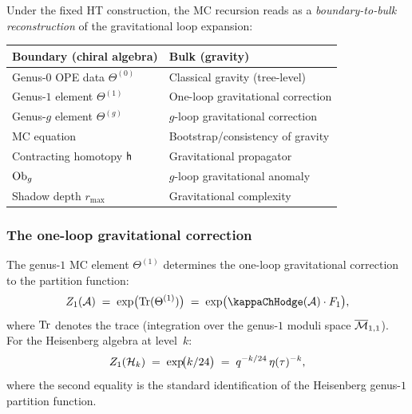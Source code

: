 \begin{principle}
Under the fixed HT construction, the MC recursion reads as a
\emph{boundary-to-bulk reconstruction} of the gravitational loop
expansion:
\begin{center}
\begin{tabular}{ll}
\textbf{Boundary (chiral algebra)} &
\textbf{Bulk (gravity)} \\
\hline
Genus-$0$ OPE data $\Theta^{(0)}$ &
Classical gravity (tree-level) \\
Genus-$1$ element $\Theta^{(1)}$ &
One-loop gravitational correction \\
Genus-$g$ element $\Theta^{(g)}$ &
$g$-loop gravitational correction \\
MC equation &
Bootstrap/consistency of gravity \\
Contracting homotopy $\mathsf{h}$ &
Gravitational propagator \\
$\mathrm{Ob}_g$ &
$g$-loop gravitational anomaly \\
Shadow depth $r_{\max}$ &
Gravitational complexity
\end{tabular}
\end{center}
\end{principle}

\subsubsection{The one-loop gravitational correction}

\begin{theorem}
The genus-$1$ MC element $\Theta^{(1)}$ determines the one-loop
gravitational correction to the partition function:
\begin{equation}%
Z_1(\cA)
\;=\;
\exp\bigl(\Tr(\Theta^{(1)})\bigr)
\;=\;
\exp\bigl(\kappaChHodge(\cA) \cdot F_1\bigr),
\end{equation}
where $\operatorname{Tr}$ denotes the trace (integration over the genus-$1$
moduli space $\overline{\mathcal{M}}_{1,1}$). For the Heisenberg
algebra at level~$k$:
\begin{equation}%
Z_1(\cH_k)
\;=\;
\exp\!\bigl(k/24\bigr)
\;=\;
q^{-k/24}\, \eta(\tau)^{-k},
\end{equation}
where the second equality is the standard identification of the
Heisenberg genus-$1$ partition function.
\end{theorem}

